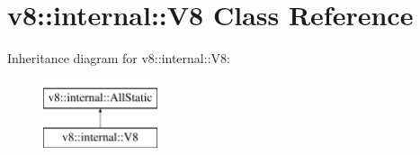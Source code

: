\hypertarget{classv8_1_1internal_1_1V8}{}\section{v8\+:\+:internal\+:\+:V8 Class Reference}
\label{classv8_1_1internal_1_1V8}
Inheritance diagram for v8\+:\+:internal\+:\+:V8\+:\begin{figure}[H]
\begin{center}
\leavevmode
\includegraphics[height=2.000000cm]{classv8_1_1internal_1_1V8}
\end{center}
\end{figure}

